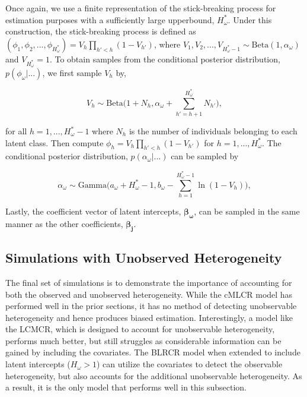 \documentclass[
  12pt,
]{article}
\begin{document}
Once again, we use a finite representation of the stick-breaking process
for estimation purposes with a sufficiently large upperbound,
\(H_\omega^*\). Under this construction, the stick-breaking process is
defined as
\((\phi_{1},\phi_{2},...,\phi_{H_\omega^*}) = V_{h} \prod_{{h'}<h}(1-V_{{h'}})\),
where
\(V_{1}, V_{2}, ..., V_{H_\omega^*-1} \sim \text{Beta}(1,\alpha_\omega)\)
and \(V_{H_\omega^*}=1\). To obtain samples from the conditional
posterior distribution, \(p(\phi_\omega|...)\), we first sample \(V_h\)
by,

\vspace{-10px}

\begin{equation}
\label{eqn:latentvariablePHIomega}
V_h \sim \text{Beta}\Big(1+N_h,\alpha_\omega + \sum_{h'=h+1}^{H^*_\omega} N_{h'}\Big),
\end{equation}

for all \(h=1,...,H_\omega^*-1\) where \(N_{h}\) is the number of
individuals belonging to each latent class. Then compute
\(\phi_{h} = V_h \prod_{{h'}<h}(1-V_{h'})\) for \(h=1,...,H^*_\omega.\)
The conditional posterior distribution, \(p(\alpha_\omega|...)\) can be
sampled by

\vspace{-10px}

\begin{equation}
\label{eqn:alphaomegacondsampling}
\alpha_\omega \sim \text{Gamma}\Big(a_\omega + H_\omega^* - 1, b_\omega - \sum_{h=1}^{H^*_\omega-1}\ln (1-V_h)\Big),
\end{equation}

Lastly, the coefficient vector of latent intercepts,
\(\boldsymbol{\beta_\omega}\), can be sampled in the same manner as the
other coefficients, \(\boldsymbol{\beta_j}\).

\subsection{Simulations with Unobserved Heterogeneity}
\label{Sec:simsunobservedheterogeneity}

The final set of simulations is to demonstrate the importance of
accounting for both the observed and unobserved heterogeneity. While the
cMLCR model has performed well in the prior sections, it has no method
of detecting unobservable heterogeneity and hence produces biased
estimation. Interestingly, a model like the LCMCR, which is designed to
account for unobservable heterogeneity, performs much better, but still
struggles as considerable information can be gained by including the
covariates. The BLRCR model when extended to include latent intercepts
(\(H_\omega>1\)) can utilize the covariates to detect the observable
heterogeneity, but also accounts for the additional unobservable
heterogeneity. As a result, it is the only model that performs well in
this subsection.
\end{document}
